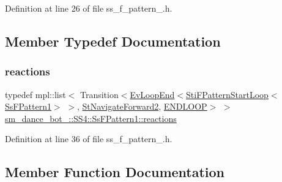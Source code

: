 Definition at line 26 of file ss\+\_\+f\+\_\+pattern\+\_.\+h.



\subsection{Member Typedef Documentation}
\mbox{\label{structsm__dance__bot__2_1_1SS4_1_1SsFPattern1_a77816d0a62d0a0a0183249c48e1ae756}} 
\subsubsection{\texorpdfstring{reactions}{reactions}}
{\footnotesize\ttfamily typedef mpl\+::list$<$ Transition$<$\hyperlink{structsmacc_1_1default__events_1_1EvLoopEnd}{Ev\+Loop\+End}$<$\hyperlink{classsm__dance__bot__2_1_1f__pattern__states_1_1StiFPatternStartLoop}{Sti\+F\+Pattern\+Start\+Loop}$<$\hyperlink{structsm__dance__bot__2_1_1SS4_1_1SsFPattern1}{Ss\+F\+Pattern1}$>$ $>$, \hyperlink{structsm__dance__bot__2_1_1StNavigateForward2}{St\+Navigate\+Forward2}, \hyperlink{structsmacc_1_1default__transition__tags_1_1ENDLOOP}{E\+N\+D\+L\+O\+OP}$>$ $>$ \hyperlink{structsm__dance__bot__2_1_1SS4_1_1SsFPattern1_a77816d0a62d0a0a0183249c48e1ae756}{sm\+\_\+dance\+\_\+bot\+\_\+::\+S\+S4\+::\+Ss\+F\+Pattern1\+::reactions}}



Definition at line 36 of file ss\+\_\+f\+\_\+pattern\+\_.\+h.



\subsection{Member Function Documentation}
\mbox{\label{structsm__dance__bot__2_1_1SS4_1_1SsFPattern1_ac9279af9076b82ec221309a79f66a1b0}} 
